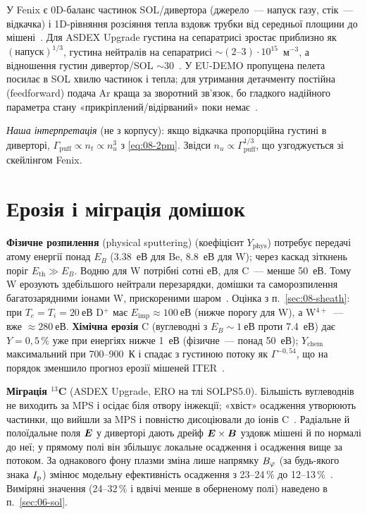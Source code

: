 \begin{corpusexample}
У Fenix є 0D-баланс частинок SOL/дивертора (джерело~--- напуск газу, стік~--- відкачка) і 1D-рівняння розсіяння тепла вздовж трубки від середньої площини до мішені~\cite[с.~4]{Fable2022}. Для ASDEX Upgrade густина на сепаратрисі зростає приблизно як $(\text{напуск})^{1/3}$, густина нейтралів на сепаратрисі $\sim(2\text{--}3)\cdot10^{15}$~м$^{-3}$, а відношення густин дивертор/SOL $\sim30$~\cite[с.~7]{Fable2022}. У EU-DEMO пропущена пелета посилає в SOL хвилю частинок і тепла; для утримання детачменту постійна (feedforward) подача Ar краща за зворотний зв'язок, бо гладкого надійного параметра стану «прикріплений/відірваний» поки немає~\cite[с.~8]{Fable2022}.
\end{corpusexample}
\emph{Наша інтерпретація} (не з корпусу): якщо відкачка пропорційна густині в диверторі, $\Gamma_{\mathrm{puff}}\propto n_t\propto n_u^3$ з \eqref{eq:08-2pm}. Звідси $n_u\propto\Gamma_{\mathrm{puff}}^{1/3}$, що узгоджується зі скейлінгом Fenix.

\section{Ерозія і міграція домішок}\label{sec:08-erosion}

\textbf{Фізичне розпилення} (physical sputtering) (коефіцієнт $Y_{\mathrm{phys}}$) потребує передачі атому енергії понад $E_B$ (\SI{3,38}{еВ} для Be, \SI{8,8}{еВ} для W); через каскад зіткнень поріг $E_{\mathrm{th}}\gg E_B$. Водню для W потрібні сотні еВ, для C~--- менше \SI{50}{еВ}. Тому W ерозують здебільшого нейтрали перезарядки, домішки та саморозпилення багатозарядними іонами W, прискореними шаром~\cite[с.~32]{AhoMantila2011}. Оцінка з п.~\ref{sec:08-sheath}: при $T_e=T_i=\SI{20}{еВ}$ D$^+$ має $E_{\mathrm{imp}}\approx\SI{100}{еВ}$ (нижче порогу для W), а W$^{4+}$~--- вже $\approx\SI{280}{еВ}$. \textbf{Хімічна ерозія} C (вуглеводні з $E_B\sim\SI{1}{еВ}$ проти \SI{7,4}{еВ}) дає $Y=0{,}5\,\%$ уже при енергіях нижче \SI{1}{еВ} (фізичне~--- понад \SI{50}{еВ}); $Y_{\mathrm{chem}}$ максимальний при 700--900~К і спадає з густиною потоку як $\Gamma^{-0{,}54}$, що на порядок зменшило прогноз ерозії мішеней ITER~\cite[с.~33--34]{AhoMantila2011}.

\textbf{Міграція $^{13}$C} (ASDEX Upgrade, ERO на тлі SOLPS5.0). Більшість вуглеводнів не виходить за MPS і осідає біля отвору інжекції; «хвіст» осадження утворюють частинки, що вийшли за MPS і повністю дисоціювали до іонів C~\cite[с.~64]{AhoMantila2011}. Радіальне й полоїдальне поля $\bm{E}$ у диверторі дають дрейф $\bm{E}\times\bm{B}$ уздовж мішені й по нормалі до неї; у прямому полі він збільшує локальне осадження і осадження вище за потоком. За однакового фону плазми зміна лише напрямку $B_{\varphi}$ (за будь-якого знака $I_{\mathrm{p}}$) змінює модельну ефективність осадження з 23--24\,\% до 12--13\,\%~\cite[с.~63--64, рис.~5.2]{AhoMantila2011}. Виміряні значення (24--32\,\% і вдвічі менше в оберненому полі) наведено в п.~\ref{sec:06-sol}.

